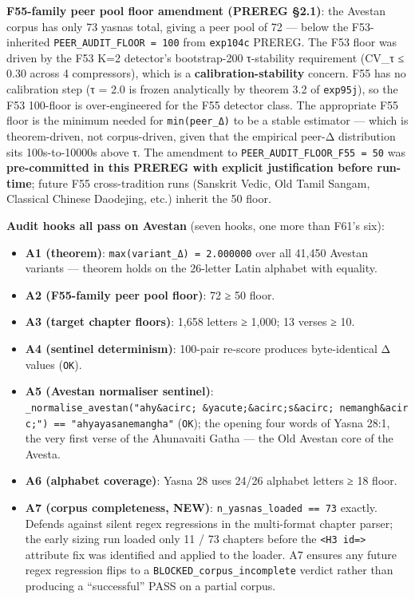 \documentclass[
]{article}
\providecommand{\tightlist}{%
  \setlength{\itemsep}{0pt}\setlength{\parskip}{0pt}}
\begin{document}
\textbf{F55-family peer pool floor amendment (PREREG §2.1)}: the Avestan
corpus has only 73 yasnas total, giving a peer pool of 72 --- below the
F53-inherited \texttt{PEER\_AUDIT\_FLOOR\ =\ 100} from \texttt{exp104c}
PREREG. The F53 floor was driven by the F53 K=2 detector's bootstrap-200
τ-stability requirement (CV\_τ ≤ 0.30 across 4 compressors), which is a
\textbf{calibration-stability} concern. F55 has no calibration step (τ =
2.0 is frozen analytically by theorem 3.2 of \texttt{exp95j}), so the
F53 100-floor is over-engineered for the F55 detector class. The
appropriate F55 floor is the minimum needed for \texttt{min(peer\_Δ)} to
be a stable estimator --- which is theorem-driven, not corpus-driven,
given that the empirical peer-Δ distribution sits 100s-to-10000s above
τ. The amendment to \texttt{PEER\_AUDIT\_FLOOR\_F55\ =\ 50} was
\textbf{pre-committed in this PREREG with explicit justification before
run-time}; future F55 cross-tradition runs (Sanskrit Vedic, Old Tamil
Sangam, Classical Chinese Daodejing, etc.) inherit the 50 floor.

\textbf{Audit hooks all pass on Avestan} (seven hooks, one more than
F61's six):

\begin{itemize}
\tightlist
\item
  \textbf{A1 (theorem)}: \texttt{max(variant\_Δ)\ =\ 2.000000} over all
  41,450 Avestan variants --- theorem holds on the 26-letter Latin
  alphabet with equality.
\item
  \textbf{A2 (F55-family peer pool floor)}: 72 ≥ 50 floor.
\item
  \textbf{A3 (target chapter floors)}: 1,658 letters ≥ 1,000; 13 verses
  ≥ 10.
\item
  \textbf{A4 (sentinel determinism)}: 100-pair re-score produces
  byte-identical Δ values (\texttt{OK}).
\item
  \textbf{A5 (Avestan normaliser sentinel)}:
  \texttt{\_normalise\_avestan("ahy\&acirc;\ \&yacute;\&acirc;s\&acirc;\ nemangh\&acirc;")\ ==\ "ahyayasanemangha"}
  (\texttt{OK}); the opening four words of Yasna 28:1, the very first
  verse of the Ahunavaiti Gatha --- the Old Avestan core of the Avesta.
\item
  \textbf{A6 (alphabet coverage)}: Yasna 28 uses 24/26 alphabet letters
  ≥ 18 floor.
\item
  \textbf{A7 (corpus completeness, NEW)}:
  \texttt{n\_yasnas\_loaded\ ==\ 73} exactly. Defends against silent
  regex regressions in the multi-format chapter parser; the early sizing
  run loaded only 11 / 73 chapters before the
  \texttt{\textless{}H3\ id=\textgreater{}} attribute fix was identified
  and applied to the loader. A7 ensures any future regex regression
  flips to a \texttt{BLOCKED\_corpus\_incomplete} verdict rather than
  producing a ``successful'' PASS on a partial corpus.
\end{itemize}
\end{document}
